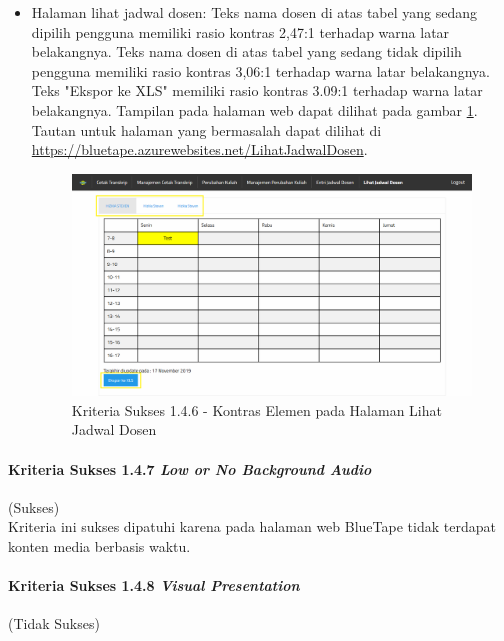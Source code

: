 \documentclass[a4paper,twoside]{article}
\begin{document}
\begin{enumerate}
\begin{itemize}
			\item Halaman lihat jadwal dosen: Teks nama dosen di atas tabel yang sedang dipilih pengguna memiliki rasio kontras 2,47:1 terhadap warna latar belakangnya. Teks nama dosen di atas tabel yang sedang tidak dipilih pengguna memiliki rasio kontras 3,06:1 terhadap warna latar belakangnya. Teks "Ekspor ke XLS" memiliki rasio kontras 3.09:1 terhadap warna latar belakangnya. Tampilan pada halaman web dapat dilihat pada gambar \ref{fig:1.4.6_contrast_enchanced_7}. Tautan untuk halaman yang bermasalah dapat dilihat di \url{https://bluetape.azurewebsites.net/LihatJadwalDosen}.
			\begin{figure}[H]
				\centering  
				\includegraphics[scale=0.3, frame]{kriteria-sukses-1-4-6-contrast-enchanced-7}  
				\caption[Kriteria Sukses 1.4.6 - Kontras Elemen pada Halaman Lihat Jadwal Dosen]{Kriteria Sukses 1.4.6 - Kontras Elemen pada Halaman Lihat Jadwal Dosen}
				\label{fig:1.4.6_contrast_enchanced_7}  
			\end{figure} 
		\end{itemize}

		\paragraph{Kriteria Sukses 1.4.7 \textit{Low or No Background Audio}}
		\label{par:kepatuhan_bluetape_kriteria_sukses_1.4.7}
		(Sukses)\\

		Kriteria ini sukses dipatuhi karena pada halaman web BlueTape tidak terdapat konten media berbasis waktu.

		\paragraph{Kriteria Sukses 1.4.8 \textit{Visual Presentation}}
		\label{par:kepatuhan_bluetape_kriteria_sukses_1.4.8}
		(Tidak Sukses)\\


\end{enumerate}
\end{document}
